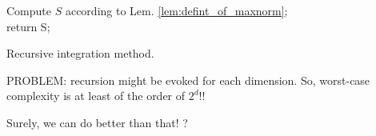 \IncMargin{-1em}
\begin{algorithm}
\begin{small}
%
\BlankLine
Compute $S$ according to Lem. \ref{lem:defint_of_maxnorm};\\
return S;

\caption{Recursive integration method.}

\label{alg:recursivequad1}
\end{small}
\end{algorithm}

PROBLEM: recursion might be evoked for each dimension. So, worst-case complexity is at least of the order of $2^d$!!

\begin{ques}
Surely, we can do better than that! ?
\end{ques}
